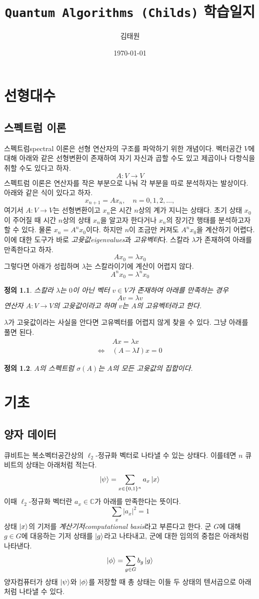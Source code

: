 \documentclass[a4paper,chapter,atbegshi]{oblivoir}
\title{\texttt{Quantum Algorithms (Childs)} 학습일지}
\author{김태원}
\date{\today}
\newtheorem{defn}{정의}[chapter]
\begin{document}
\maketitle
\chapter{선형대수}
\section{스펙트럼 이론}
스펙트럼{\footnotesize spectral} 이론은 선형 연산자의 구조를 파악하기 위한
개념이다. 벡터공간 $V$에 대해 아래와 같은 선형변환이 존재하여 자기 자신과
곱할 수도 있고 제곱이나 다항식을 취할 수도 있다고 하자.
\[
  A:V\rightarrow V
\]
스펙트럼 이론은 연산자를 작은 부분으로 나눠 각 부분을 따로 분석하자는 발상이다.
아래와 같은 식이 있다고 하자.
\[
  x_{n+1}=Ax_n,\quad n=0,1,2,\ldots,
\]
여기서 $A:V\rightarrow V$는 선형변환이고 $x_n$은 시간 $n$상의 계가 지니는 상태다.
초기 상태 $x_0$이 주어질 때 시간 $n$상의 상태 $x_n$을 알고자 한다거나
$x_n$의 장기간 행태를 분석하고자 할 수 있다. 물론 $x_n=A^n x_0$이다.
하지만 $n$이 조금만 커져도 $A^n x_0$을 계산하기 어렵다. 이에 대한 도구가
바로 \emph{고윳값\footnotesize eigenvalues}과 \emph{고유벡터}다. 스칼라
$\lambda$가 존재하여 아래를 만족한다고 하자.
\[
  Ax_0=\lambda x_0
\]
그렇다면 아래가 성립하며 $\lambda$는 스칼라이기에 계산이 어렵지 않다.
\[
  A^nx_0=\lambda^nx_0
\]
\begin{defn}\normalfont
  스칼라 $\lambda$는 $0$이 아닌 벡터 $v\in V$가 존재하여 아래를 만족하는 경우
  \[
    Av=\lambda v
  \]
  연산자 $A:V\rightarrow V$의 \emph{고윳값}이라고 하며 $v$는 $A$의 
  \emph{고유벡터}라고 한다.
\end{defn}
$\lambda$가 고윳값이라는 사실을 안다면 고유벡터를 어렵지 않게 찾을 수 있다.
그냥 아래를 풀면 된다.
\begin{align*}
  \;& Ax=\lambda x \\
  \Leftrightarrow\; &(A-\lambda I)x=0
\end{align*}
\begin{defn}\normalfont
  $A$의 \emph{스펙트럼} $\sigma(A)$는 $A$의 모든 고윳값의 집합이다.
\end{defn}
\chapter{기초}
\section{양자 데이터}
큐비트는 복소벡터공간상의 $\ell_2$-정규화 벡터로 나타낼 수 있는 상태다. 이를테면
$n$ 큐비트의 상태는 아래처럼 적는다.
\[
  \ket{\psi} = \sum_{x\in\{0,1\}^n}a_x\ket{x}
\]
이때 $\ell_2$-정규화 벡터란 $a_x\in\mathbb{C}$가 아래를 만족한다는 뜻이다.
\[
  \sum_x|a_x|^2=1
\]
상태 $\ket{x}$의 기저를 \emph{계산기저\footnotesize{computational basis}}라고
부른다고 한다.
군 $G$에 대해 $g\in G$에 대응하는 기저 상태를 $\ket{g}$라고 나타내고, 군에 대한
임의의 중첩은 아래처럼 나타낸다.
\[
  \ket{\phi}=\sum_{g\in G}b_g\ket{g}
\]
양자컴퓨터가 상태 $\ket{\psi}$와 $\ket{\phi}$를 저장할 때 총 상태는 이들 두
상태의 텐서곱으로 아래처럼 나타낼 수 있다.
\end{document}
